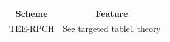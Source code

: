 \begin{tabular}{c c}
\toprule
Scheme & Feature \\
\midrule
TEE-RPCH & See targeted table1 theory \\
\bottomrule
\end{tabular}
